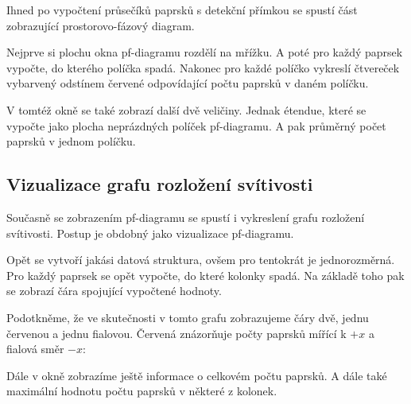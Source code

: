Ihned po vypočtení průsečíků paprsků s detekční přímkou se spustí část zobrazující prostorovo-fázový diagram.

Nejprve si plochu okna pf-diagramu rozdělí na mřížku. A poté pro každý paprsek vypočte, do kterého políčka spadá. Nakonec pro každé políčko vykreslí čtvereček vybarvený odstínem červené odpovídající počtu paprsků v daném políčku.

V tomtéž okně se také zobrazí další dvě veličiny. Jednak étendue, které se vypočte jako plocha neprázdných políček pf-diagramu. A pak průměrný počet paprsků v jednom políčku.


\subsection{Vizualizace grafu rozložení svítivosti}

Současně se zobrazením pf-diagramu se spustí i vykreslení grafu rozložení svítivosti. Postup je obdobný jako vizualizace pf-diagramu.

Opět se vytvoří jakási datová struktura, ovšem pro tentokrát je jednorozměrná. Pro každý paprsek se opět vypočte, do které kolonky spadá. Na základě toho pak se zobrazí čára spojující vypočtené hodnoty.

Podotkněme, že ve skutečnosti v tomto grafu zobrazujeme čáry dvě, jednu červenou a jednu fialovou. Červená znázorňuje počty paprsků mířící k $+x$ a fialová směr $-x$:

Dále v okně zobrazíme ještě informace o celkovém počtu paprsků. A dále také maximální hodnotu počtu paprsků v některé z kolonek.

